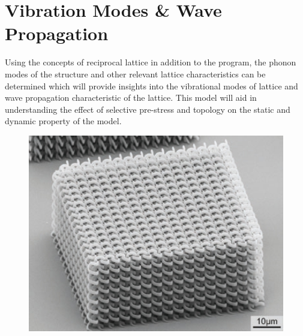 \section{Vibration Modes \& Wave Propagation}
Using the concepts of reciprocal lattice in addition to the program, the phonon modes of the structure and other relevant lattice characteristics can be determined which will provide insights into the vibrational modes of lattice and wave propagation characteristic of the lattice. This model will aid in understanding the effect of selective pre-stress and topology on the static and dynamic property of the model.\cite{Ma}
\begin{figure}[!htbp]
    \centering
    \includegraphics[width = 1\textwidth]{Figures/wave_prop_metamterials.jpg}
\end{figure}
